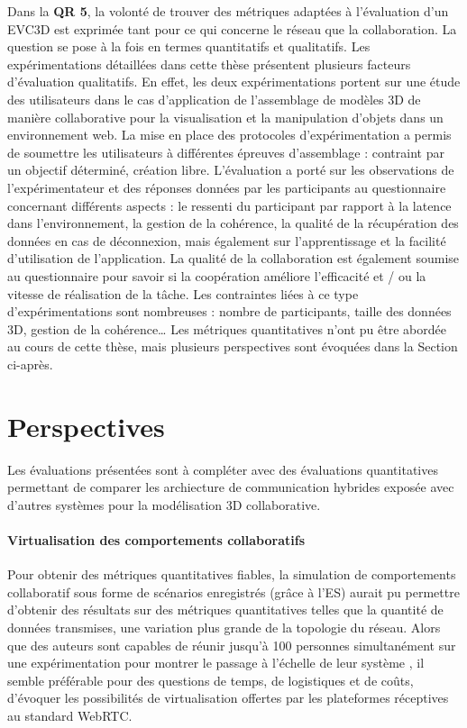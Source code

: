 %
Dans la \textbf{QR 5}, la volonté de trouver des métriques adaptées à l'évaluation 
d'un \gls{EVC3D} est exprimée tant pour ce qui concerne le réseau que la 
collaboration. La 
question se pose à la fois en termes quantitatifs et qualitatifs.
Les expérimentations détaillées dans cette thèse présentent plusieurs facteurs 
d'évaluation qualitatifs. En effet, les deux expérimentations portent sur une étude 
des utilisateurs dans le cas d'application de l'assemblage de modèles 3D de 
manière collaborative pour la visualisation et la manipulation d'objets dans un 
environnement web.
La mise en place des protocoles d'expérimentation a permis de soumettre les 
utilisateurs à différentes épreuves d'assemblage : contraint par un objectif 
déterminé, création libre. 
L'évaluation a porté sur les observations de l'expérimentateur et des réponses 
données par les participants au questionnaire concernant différents aspects : le 
ressenti du participant par rapport à la latence dans l'environnement, la gestion de 
la cohérence, la qualité de la récupération des données en cas de déconnexion, 
mais également sur l'apprentissage et la facilité d'utilisation de l'application. La 
qualité de la collaboration est également soumise au questionnaire pour savoir si 
la coopération améliore l'efficacité et / ou la vitesse de réalisation de la tâche.
Les contraintes liées à ce type d'expérimentations sont nombreuses : nombre de 
participants, taille des données 3D, gestion de la cohérence\dots 
Les métriques quantitatives n'ont pu être abordée au cours de cette thèse, mais 
plusieurs perspectives sont évoquées dans la Section  
ci-après.


\section{Perspectives}
Les évaluations présentées sont à compléter avec des évaluations quantitatives 
permettant de comparer les archiecture de communication hybrides exposée avec 
d'autres systèmes pour la modélisation 3D collaborative. 

\paragraph{Virtualisation des comportements collaboratifs}
Pour obtenir des métriques quantitatives fiables, la simulation de comportements 
collaboratif sous forme de scénarios enregistrés (grâce à l'\gls{ES}) aurait pu 
permettre d'obtenir des résultats sur des métriques quantitatives telles que la 
quantité de données transmises, une variation plus grande de la topologie du 
réseau. Alors que des auteurs sont capables de réunir jusqu'à 100 personnes 
simultanément sur une expérimentation pour montrer le passage à l'échelle de leur 
système \cite{Hu2017}, il semble préférable pour des questions de temps, de 
logistiques et de coûts, d'évoquer les possibilités de virtualisation offertes par les 
plateformes réceptives au standard WebRTC.

